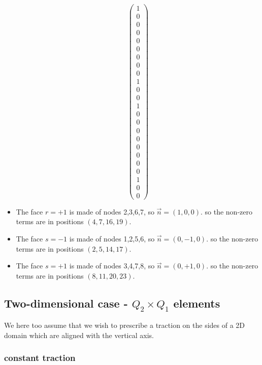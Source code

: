 \begin{itemize}
{\[\left(
\begin{array}{c}
1 \\
0\\
0\\
0\\
0\\
0\\
0\\
0\\
0\\
1\\
0\\
0\\
1\\
0\\
0\\
0\\
0\\
0\\
0\\
0\\
0\\
1\\
0\\
0
\end{array}
\right)
\]
}


\item
The face $r=+1$ is made of nodes 2,3,6,7, so $\vec{n}=(1,0,0)$.
so the non-zero terms are in positions $(4,7,16,19)$.

\item
The face $s=-1$ is made of nodes 1,2,5,6, so $\vec{n}=(0,-1,0)$.
so the non-zero terms are in positions $(2,5,14,17)$.

\item
The face $s=+1$ is made of nodes 3,4,7,8, so $\vec{n}=(0,+1,0)$.
so the non-zero terms are in positions $(8,11,20,23)$.

\end{itemize}


\subsection{Two-dimensional case - $Q_2 \times Q_1$ elements}

We here too assume that we wish to prescribe a traction on the sides of a 2D domain
which are aligned with the vertical axis.

\subsubsection{constant traction}

